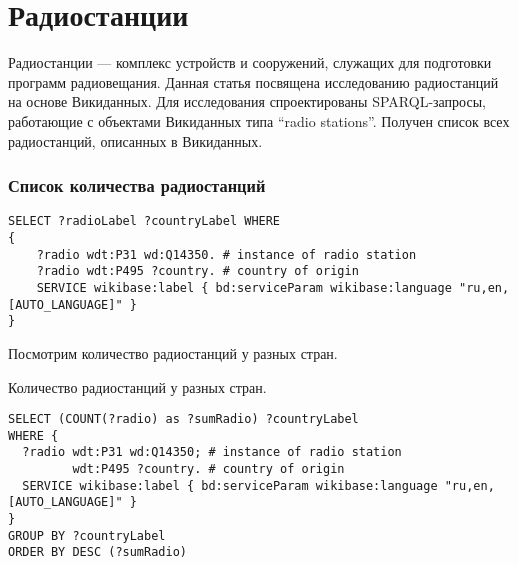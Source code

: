 \chapter[Радиостанции]{Радиостанции}
\label{ch:radio-station}

Радиостанции — комплекс устройств и сооружений, служащих для подготовки программ радиовещания. Данная статья посвящена исследованию радиостанций на основе Викиданных. Для исследования спроектированы SPARQL-запросы, работающие с объектами Викиданных типа “radio stations”. Получен список всех радиостанций, описанных в Викиданных.


\subsection{Список количества радиостанций}

\begin{lstlisting}
SELECT ?radioLabel ?countryLabel WHERE
{
    ?radio wdt:P31 wd:Q14350. # instance of radio station
    ?radio wdt:P495 ?country. # country of origin
    SERVICE wikibase:label { bd:serviceParam wikibase:language "ru,en,[AUTO_LANGUAGE]" }
}
\end{lstlisting}%


\newpage

Посмотрим количество радиостанций у разных стран.

Количество радиостанций у разных стран.

\begin{lstlisting}
SELECT (COUNT(?radio) as ?sumRadio) ?countryLabel
WHERE {
  ?radio wdt:P31 wd:Q14350; # instance of radio station
         wdt:P495 ?country. # country of origin
  SERVICE wikibase:label { bd:serviceParam wikibase:language "ru,en,[AUTO_LANGUAGE]" }
}
GROUP BY ?countryLabel
ORDER BY DESC (?sumRadio)
\end{lstlisting}%


